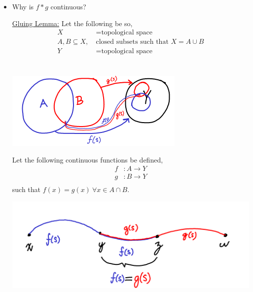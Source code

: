     \begin{itemize}
        \item Why is $f*g$ continuous?\\
        \begin{theorem}
            \underline{Gluing Lemma:} Let the following be so,
            \begin{align*}
                X &= \text{topological space}\\
                A,B \subseteq X,\ &\text{closed subsets such that } X=A\cup B\\
                Y &= \text{topological space}\\
            \end{align*}\\
                \begin{minipage}[c]{\linewidth}
                    \begin{center}
                    \includegraphics[]{images/gluing_lemma_2.png}
                    \end{center}
                \end{minipage}
            Let the following continuous functions be defined,
            \begin{align*}
                f&: A \rightarrow Y\\
                g&: B \rightarrow Y\\
            \end{align*}
            such that $f(x)=g(x)\ \forall x \in A\cap B$.\\
                        \begin{minipage}[c]{\linewidth}
                            \begin{center}
                            \includegraphics[]{images/gluing_lemma.png}

\end{center}
\end{minipage}
\end{theorem}
\end{itemize}

